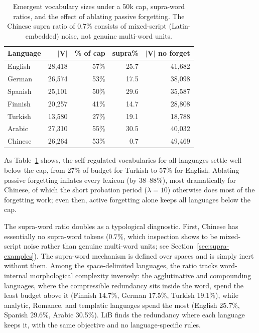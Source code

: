 \documentclass[pdflatex,sn-apa]{sn-jnl}
\begin{document}
\begin{table}[t]
\centering
\small
\begin{tabular}{lrrrr}
\toprule
\textbf{Language} & $\mathbf{|V|}$ & \textbf{\% of cap} & \textbf{supra\%} &
$\mathbf{|V|}$ \textbf{no forget} \\
\midrule
English  & 28,418 & 57\% & 25.7 & 41,682 \\
German   & 26,574 & 53\% & 17.5 & 38,098 \\
Spanish  & 25,101 & 50\% & 29.6 & 35,587 \\
Finnish  & 20,257 & 41\% & 14.7 & 28,808 \\
Turkish  & 13,580 & 27\% & 19.1 & 18,788 \\
Arabic   & 27,310 & 55\% & 30.5 & 40,032 \\
Chinese  & 26,264 & 53\% &  0.7 & 49,469 \\
\bottomrule
\end{tabular}
\caption{Emergent vocabulary sizes under a 50k cap, supra-word ratios, and
the effect of ablating passive forgetting. The Chinese supra ratio of 0.7\%
consists of mixed-script (Latin-embedded) noise, not genuine multi-word
units.}
\label{tab:supra}
\end{table}

As Table~\ref{tab:supra} shows, the self-regulated vocabularies for all languages settle well below the cap, from 27\%
of budget for Turkish to 57\% for English.%
Ablating passive forgetting inflates every lexicon (by 38--88\%), most
dramatically for Chinese, of which the short probation period ($\lambda{=}10$)
otherwise does most of the forgetting work; even then, active forgetting alone keeps all
languages below the cap.

The supra-word ratio doubles as a typological diagnostic. %
First, Chinese has essentially no
supra-word tokens ($0.7\%$, which inspection shows to be mixed-script noise
rather than genuine multi-word units; see
Section~\ref{sec:supra-examples}). The supra-word mechanism is defined
over spaces and is simply inert without them.
Among the space-delimited languages, the ratio tracks word-internal
morphological complexity inversely: the agglutinative and compounding
languages, where the compressible redundancy sits inside the word, spend the
least budget above it (Finnish 14.7\%, German 17.5\%, Turkish 19.1\%), while
analytic, Romance, and templatic languages spend the most (English 25.7\%,
Spanish 29.6\%, Arabic 30.5\%).
LiB finds the redundancy where each language keeps it, with the same
objective and no language-specific rules.
\end{document}
